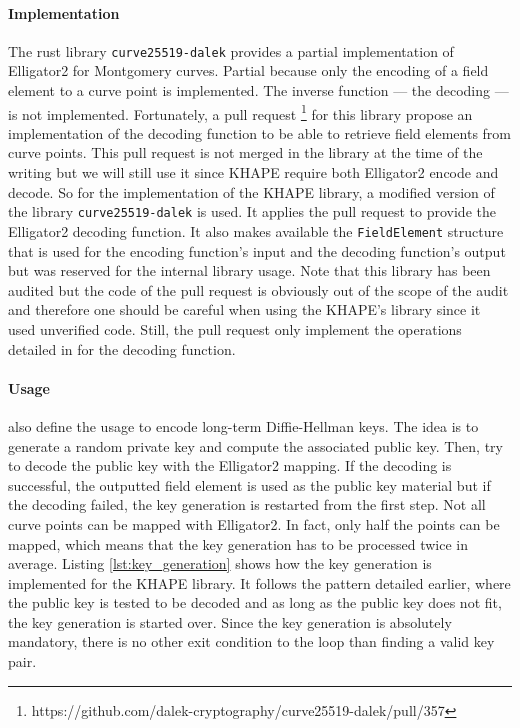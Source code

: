 ﻿\documentclass[../report.tex]{subfiles}
\begin{document}
\paragraph{Implementation}
The rust library \verb|curve25519-dalek| provides a partial implementation of Elligator2 for Montgomery curves. Partial because only the encoding of a field element to a curve point is implemented. The inverse function --- the decoding --- is not implemented. 
Fortunately, a pull request \footnote{https://github.com/dalek-cryptography/curve25519-dalek/pull/357} for this library propose an implementation of the decoding function to be able to retrieve field elements from curve points. This pull request is not merged in the library at the time of the writing but we will still use it since KHAPE require both Elligator2 encode and decode. 
So for the implementation of the KHAPE library, a modified version of the library \verb|curve25519-dalek| is used. It applies the pull request to provide the Elligator2 decoding function.  It also makes available the \verb|FieldElement| structure that is used for the encoding function’s input and the decoding function's output but was reserved for the internal library usage. 
Note that this library has been audited \cite{Curve25519_Dalek_Audit} but the code of the pull request is obviously out of the scope of the audit and therefore one should be careful when using the KHAPE's library since it used unverified code. Still, the pull request only implement the operations detailed in \cite{Elligator2_Paper} for the decoding function.


\paragraph{Usage}
\cite{Elligator2_Paper} also define the usage to encode long-term Diffie-Hellman keys. 
The idea is to generate a random private key and compute the associated public key. Then, try to decode the public key with the Elligator2 mapping. 
If the decoding is successful, the outputted field element is used as the public key material but if the decoding failed, the key generation is restarted from the first step.
Not all curve points can be mapped with Elligator2. 
In fact, only half the points can be mapped, which means that the key generation has to be processed twice in average.
Listing \ref{lst:key_generation} shows how the key generation is implemented for the KHAPE library. It follows the pattern detailed earlier, where the public key is tested to be decoded and as long as the public key does not fit, the key generation is started over. Since the key generation is absolutely mandatory, there is no other exit condition to the loop than finding a valid key pair.
\end{document}
